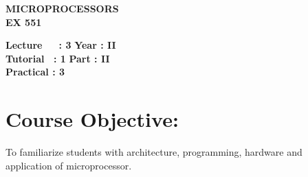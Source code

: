 \begin{center}
    \textbf{\huge{\uppercase{Microprocessors}}}
    \\
    \vspace{.5cm}
    \textbf{\large{EX 551}}
\end{center}

\noindent\textbf{Lecture\ \ \ : 3} \hfill \textbf{Year : II } \\
\textbf{Tutorial \ : 1} \hfill \textbf{Part : II } \\
\textbf{Practical : 3}\\

\par
\noindent 
\section*{Course Objective:}
To familiarize students with architecture, programming, hardware and application of microprocessor.


